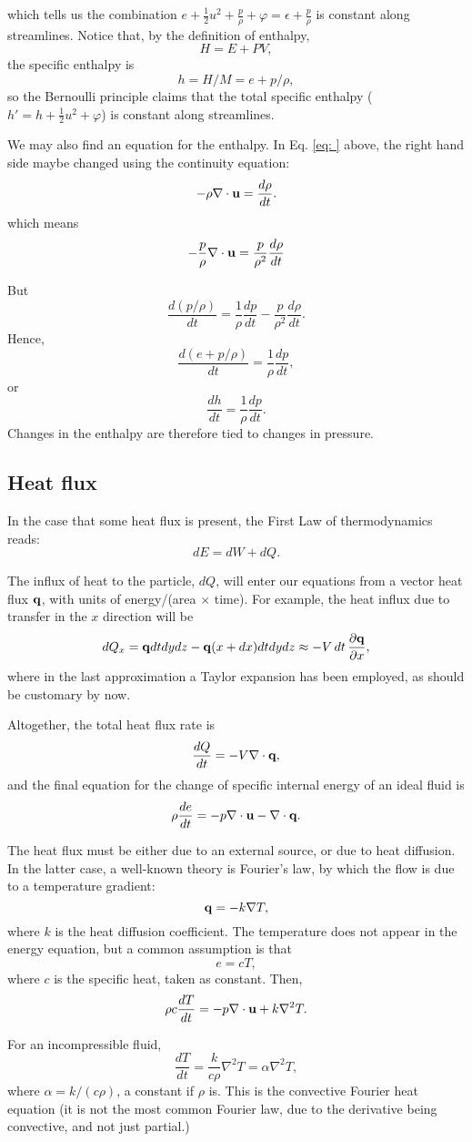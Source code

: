 which tells us the combination $ e + \frac12 u^2 + \frac{p}{\rho} +
\varphi = \epsilon + \frac{p}{\rho} $ is constant along streamlines.
Notice that, by the definition of enthalpy,
\[
H= E + P V ,
\]
the specific enthalpy is
\[
h=H/M = e + p / \rho ,
\]
so the Bernoulli principle claims that the total specific enthalpy
($h'=h + \frac12 u^2 + \varphi$) is constant along streamlines.

We may also find an equation for the enthalpy. In Eq. \ref{eq: }
above, the right hand side maybe changed using the continuity
equation:
\[
- \rho \nabla\cdot \mathbf{u} = \frac{d\rho}{dt} .
\]
which means
\[
-  \frac{p}{\rho} \nabla\cdot \mathbf{u} =
\frac{p}{\rho^2} \frac{d\rho}{dt}
\]

But
\[
\frac{d (p / \rho) }{dt} =
\frac{ 1 }{\rho} 
\frac{d p }{dt} -
\frac{ p }{\rho^2} 
\frac{d \rho }{dt}  .
\]
Hence,
\[
\frac{d ( e + p / \rho) }{dt} = \frac{ 1 }{\rho} \frac{d p }{dt} ,
\]
or
\[
\frac{d h }{dt} = \frac{ 1 }{\rho} \frac{d p }{dt} .
\]
Changes in the enthalpy are therefore tied to changes in pressure.


\subsection{Heat flux}

In the case that some heat flux is present, the First Law of
thermodynamics reads:
\[
dE=dW + dQ .
\]

The influx of heat to the particle, $dQ$, will enter our equations
from a vector heat flux $\mathbf{q}$, with units of energy/(area $\times$
time). For example, the heat influx due to transfer in the $x$ direction
will be
\[
dQ_x= \mathbf{q} dt dy dz - \mathbf{q}(x+dx) dt dy dz \approx
      - V \, dt \, \frac{\partial\mathbf{q}}{\partial x},
\]
where in the last approximation a Taylor expansion has been employed,
as should be customary by now.

Altogether, the total heat flux rate is
\[
\frac{dQ}{dt} = -V \nabla\cdot \mathbf{q},
\]
and the final equation for the change of specific internal energy of
an ideal fluid is
\[
\rho \frac{de}{dt}  = -  p \nabla\cdot \mathbf{u}  - \nabla\cdot \mathbf{q} .
\]

The heat flux must be either due to an external source, or due to heat
diffusion. In the latter case, a well-known theory is Fourier's law, by
which the flow is due to a temperature gradient:
\[
\mathbf{q}=- k \nabla T ,
\]
where $k$ is the heat diffusion coefficient. The temperature does not
appear in the energy equation, but a common assumption is that
\[
e = c T ,
\]
where $c$ is the specific heat, taken as constant. Then,
\[
\rho  c \frac{d T }{dt}  = - p \nabla\cdot \mathbf{u}  + k \nabla^2 T .
\]

For an incompressible fluid,
\[
 \frac{d T }{dt}  = \frac{ k }{ c \rho} \nabla^2 T  = \alpha \nabla^2 T ,
\]
where $\alpha = k / (c \rho)$, a constant if $\rho$ is. This is the
convective Fourier heat equation (it is not the most common Fourier
law, due to the derivative being convective, and not just partial.)

